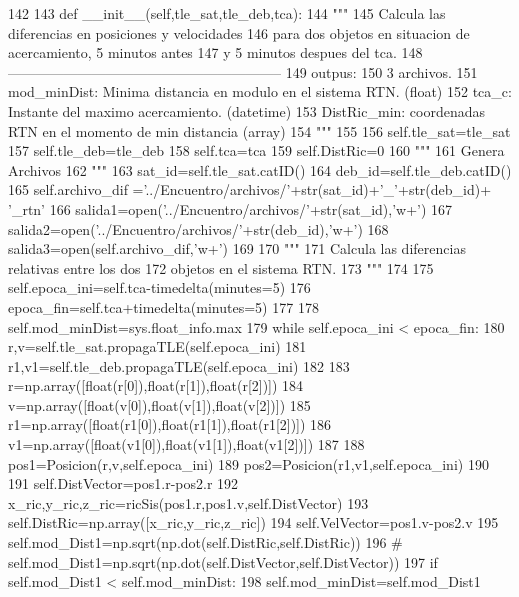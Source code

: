 \begin{DoxyCode}
142 
143     def __init__(self,tle_sat,tle_deb,tca):
144         """
145         Calcula las diferencias en posiciones y velocidades 
146         para dos objetos en situacion de acercamiento, 5 minutos antes
147         y 5 minutos despues del tca.
148         -----------------------------------------------------------
149         outpus:
150             3 archivos.
151             mod_minDist: Minima distancia en modulo en el sistema RTN. (float)
152             tca_c: Instante del maximo acercamiento. (datetime)
153             DistRic_min: coordenadas RTN en el momento de min distancia (array)
154         """
155         
156         self.tle_sat=tle_sat
157         self.tle_deb=tle_deb
158         self.tca=tca
159         self.DistRic=0         
160         """
161         Genera Archivos
162         """
163         sat_id=self.tle_sat.catID()
164         deb_id=self.tle_deb.catID()
165         self.archivo_dif ='../Encuentro/archivos/'+str(sat_id)+'_'+str(deb_id)+
      '_rtn'
166         salida1=open('../Encuentro/archivos/'+str(sat_id),'w+')
167         salida2=open('../Encuentro/archivos/'+str(deb_id),'w+')
168         salida3=open(self.archivo_dif,'w+')
169 
170         """
171         Calcula las diferencias relativas entre los dos 
172         objetos en el sistema RTN.
173         """
174 
175         self.epoca_ini=self.tca-timedelta(minutes=5)
176         epoca_fin=self.tca+timedelta(minutes=5)
177         
178         self.mod_minDist=sys.float_info.max
179         while self.epoca_ini < epoca_fin:
180             r,v=self.tle_sat.propagaTLE(self.epoca_ini)
181             r1,v1=self.tle_deb.propagaTLE(self.epoca_ini)
182             
183             r=np.array([float(r[0]),float(r[1]),float(r[2])])
184             v=np.array([float(v[0]),float(v[1]),float(v[2])])
185             r1=np.array([float(r1[0]),float(r1[1]),float(r1[2])])
186             v1=np.array([float(v1[0]),float(v1[1]),float(v1[2])])
187             
188             pos1=Posicion(r,v,self.epoca_ini)
189             pos2=Posicion(r1,v1,self.epoca_ini)
190             
191             self.DistVector=pos1.r-pos2.r
192             x_ric,y_ric,z_ric=ricSis(pos1.r,pos1.v,self.DistVector)
193             self.DistRic=np.array([x_ric,y_ric,z_ric])
194             self.VelVector=pos1.v-pos2.v
195             self.mod_Dist1=np.sqrt(np.dot(self.DistRic,self.DistRic))
196 #            self.mod_Dist1=np.sqrt(np.dot(self.DistVector,self.DistVector))
197             if self.mod_Dist1 < self.mod_minDist:
198                 self.mod_minDist=self.mod_Dist1

\end{DoxyCode}
